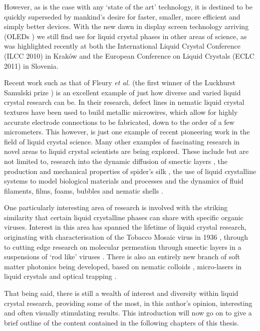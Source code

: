 However, as is the case with any `state of the art' technology, it is destined to be quickly superseded by mankind's desire for faster, smaller, more efficient and simply better devices. With the new dawn in display screen technology arriving (OLEDs \citep{Burroughes1990}) we still find use for liquid crystal phases in other areas of science, as was highlighted recently at both the International Liquid Crystal Conference (ILCC 2010) in Krak\'{o}w and the European Conference on Liquid Crystals (ECLC 2011) in Slovenia.

Recent work such as that of Fleury \textit{et al.}\cite{Fleury2009} (the first winner of the Luckhurst Samulski prize \cite{Imrie2010}) is an excellent example of just how diverse and varied liquid crystal research can be. In their research, defect lines in nematic liquid crystal textures have been used to build metallic microwires, which allow for highly accurate electrode connections to be fabricated, down to the order of a few micrometers. This however, is just one example of recent pioneering work in the field of liquid crystal science. Many other examples of fascinating research in novel areas to liquid crystal scientists are being explored. These include but are not limited to, research into the dynamic diffusion of smectic layers \cite{Nguyen2010}, the production and  mechanical properties of spider's silk \cite{Vollrath2001,Lydon2004}, the use of liquid crystalline systems to model biological materials and processes \cite{Gupta2005} and the dynamics of fluid filaments, films, foams, bubbles and nematic shells \cite{Muller2007,Bird2010,Fernandez-Nieves2007}.
 
One particularly interesting area of research is involved with the striking similarity that certain liquid crystalline phases can share with specific organic viruses. Interest in this area has spanned the lifetime of liquid crystal research, originating with characterisation of the Tobacco Mosaic virus in 1936 \cite{Bawden1936}, through to cutting edge research on molecular permeation through smectic layers in a suspensions of `rod like' viruses \cite{Lettinga2007,Tkachenko1996, Helfrich1969}. There is also an entirely new branch of soft matter photonics being developed, based on nematic colloids \cite{Yablonovitch1987}, micro-lasers in liquid crystals \cite{Humar2010,Schafer2008,Doane1986} and optical trapping \cite{Smalyukh2005,Yada2004}.
 
That being said, there is still a wealth of interest and diversity within liquid crystal research, providing some of the most, in this author's opinion, interesting and often visually stimulating results. This introduction will now go on to give a brief outline of the content contained in the following chapters of this thesis.

